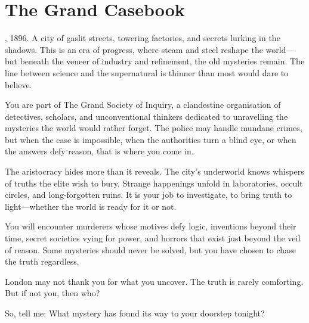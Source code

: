 \chapter{The Grand Casebook}\label{chap:grand-casebook}

\begin{DndReadAloud}{}
	, 1896. A city of gaslit streets, towering factories, and secrets lurking in the shadows. This is an era of progress, where steam and steel reshape the world—but beneath the veneer of industry and refinement, the old mysteries remain. The line between science and the supernatural is thinner than most would dare to believe.

	You are part of The Grand Society of Inquiry, a clandestine organisation of detectives, scholars, and unconventional thinkers dedicated to unravelling the mysteries the world would rather forget. The police may handle mundane crimes, but when the case is impossible, when the authorities turn a blind eye, or when the answers defy reason, that is where you come in.

	The aristocracy hides more than it reveals. The city’s underworld knows whispers of truths the elite wish to bury. Strange happenings unfold in laboratories, occult circles, and long-forgotten ruins. It is your job to investigate, to bring truth to light—whether the world is ready for it or not.

	You will encounter murderers whose motives defy logic, inventions beyond their time, secret societies vying for power, and horrors that exist just beyond the veil of reason. Some mysteries should never be solved, but you have chosen to chase the truth regardless.

	London may not thank you for what you uncover. The truth is rarely comforting. But if not you, then who?

	So, tell me: What mystery has found its way to your doorstep tonight?
\end{DndReadAloud}







